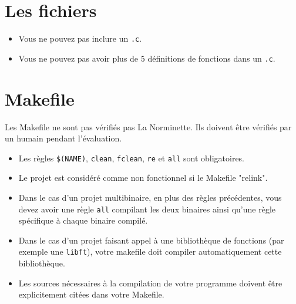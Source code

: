 \documentclass{42-fr}
\begin{document}
    \section{Les fichiers}

        \begin{itemize}

            \item Vous ne pouvez pas inclure un \texttt{.c}.

            \item Vous ne pouvez pas avoir plus de 5 définitions de fonctions dans un \texttt{.c}.

        \end{itemize}
        \newpage


    \section{Makefile}

            Les Makefile ne sont pas vérifiés pas La Norminette.
            Ils doivent être vérifiés par un humain pendant l'évaluation.
            \begin{itemize}

                \item Les règles \texttt{\$(NAME)}, \texttt{clean}, \texttt{fclean}, \texttt{re} et \texttt{all}
                    sont obligatoires.

                \item Le projet est considéré comme non fonctionnel si le Makefile "relink".

                  \item Dans le cas d’un projet multibinaire, en plus des règles précédentes,
                    vous devez avoir une règle \texttt{all} compilant les deux binaires ainsi qu’une règle
                    spécifique à chaque binaire compilé.
                
                  \item Dans le cas d’un projet faisant appel à une bibliothèque de fonctions
                    (par exemple une \texttt{libft}), votre makefile doit compiler
                    automatiquement cette bibliothèque.

                  \item Les sources nécessaires à la compilation de votre programme doivent être
                    explicitement citées dans votre Makefile.

            \end{itemize}
\end{document}
